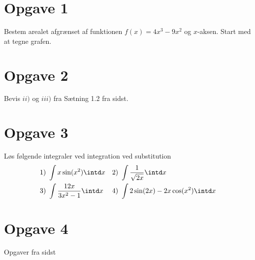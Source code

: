 \section*{Opgave 1}
Bestem arealet afgrænset af funktionen $f(x) = 4x^3-9x^2$ og $x$-aksen. Start med at tegne grafen.

\section*{Opgave 2}
Bevis $ii)$ og $iii)$ fra Sætning 1.2 fra sidst.

\section*{Opgave 3}
Løs følgende integraler ved integration ved substitution
\begin{align*}
&1) \ \int x\sin(x^2)\intd x   &&2) \ \int \frac{1}{\sqrt{2x}} \intd x   \\
&3) \  \int \frac{12x}{3x^2-1} \intd x   &&4) \ \int 2\sin(2x) -2x\cos(x^2)\intd x   \\
\end{align*}

\section*{Opgave 4}
Opgaver fra sidst